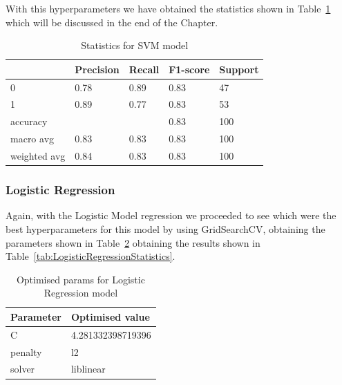 With this hyperparameters we have obtained the statistics shown in Table~\ref{tab:SVM-statistics} which will be discussed in the end of the Chapter.

\begin{table}[!htp]
\centering
\begin{tabular}{|l|l|l|l|l|}
\hline
\textbf{}    & \textbf{Precision} & \textbf{Recall} & \textbf{F1-score} & \textbf{Support} \\ \hline
0            & 0.78               & 0.89            & 0.83     & 47      \\ \hline
1            & 0.89               & 0.77            & 0.83     & 53      \\ \hline
accuracy     &                    &                 & 0.83     & 100     \\ \hline
macro avg    & 0.83               & 0.83            & 0.83     & 100     \\ \hline
weighted avg & 0.84               & 0.83            & 0.83     & 100     \\ \hline
\end{tabular}
\caption{Statistics for SVM model}
\label{tab:SVM-statistics}
\end{table}

\subsubsection{Logistic Regression}
Again, with the Logistic Model regression we proceeded to see which were the best hyperparameters for this model by using GridSearchCV, obtaining the parameters shown in Table~\ref{tab:LRoptimisedparams} obtaining the results shown in Table~\ref{tab:LogisticRegressionStatistics}.

\begin{table}[]
\centering
\begin{tabular}{|l|l|}
\hline
\textbf{Parameter} & \textbf{Optimised value} \\ \hline
C                  & 4.281332398719396        \\ \hline
penalty            & l2                       \\ \hline
solver             & liblinear                \\ \hline
\end{tabular}
\caption{Optimised params for Logistic Regression model}
\label{tab:LRoptimisedparams}
\end{table}

